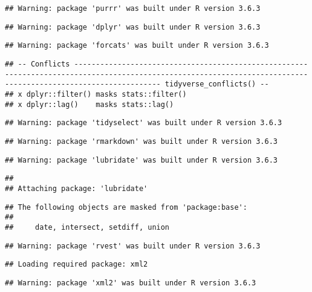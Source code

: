 \documentclass{article}
\begin{document}
\begin{verbatim}
## Warning: package 'purrr' was built under R version 3.6.3
\end{verbatim}

\begin{verbatim}
## Warning: package 'dplyr' was built under R version 3.6.3
\end{verbatim}

\begin{verbatim}
## Warning: package 'forcats' was built under R version 3.6.3
\end{verbatim}

\begin{verbatim}
## -- Conflicts ---------------------------------------------------------------------------------------------------------------------------------------------------------------- tidyverse_conflicts() --
## x dplyr::filter() masks stats::filter()
## x dplyr::lag()    masks stats::lag()
\end{verbatim}

\begin{verbatim}
## Warning: package 'tidyselect' was built under R version 3.6.3
\end{verbatim}

\begin{verbatim}
## Warning: package 'rmarkdown' was built under R version 3.6.3
\end{verbatim}

\begin{verbatim}
## Warning: package 'lubridate' was built under R version 3.6.3
\end{verbatim}

\begin{verbatim}
## 
## Attaching package: 'lubridate'
\end{verbatim}

\begin{verbatim}
## The following objects are masked from 'package:base':
## 
##     date, intersect, setdiff, union
\end{verbatim}

\begin{verbatim}
## Warning: package 'rvest' was built under R version 3.6.3
\end{verbatim}

\begin{verbatim}
## Loading required package: xml2
\end{verbatim}

\begin{verbatim}
## Warning: package 'xml2' was built under R version 3.6.3
\end{verbatim}
\end{document}
